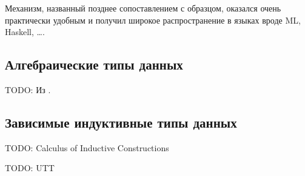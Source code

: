 Механизм, названный позднее сопоставлением с образцом, оказался очень
практически удобным и получил широкое распространение в языках
вроде ML, Haskell, \dots.

\subsection{Алгебраические типы данных}

TODO: Из \cite{transformation-system-for-developing-recursive-programs}.

\subsection{Зависимые индуктивные типы данных}

TODO: Calculus of Inductive Constructions

TODO: UTT
